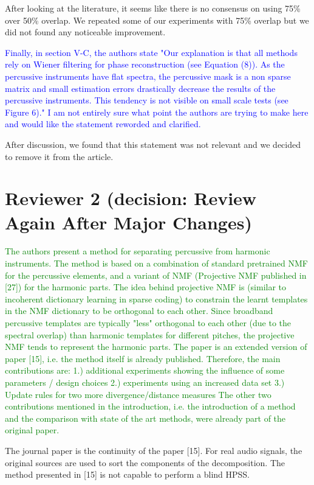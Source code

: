 \documentclass[]{article}
\begin{document}
After looking at the literature, it seems like there is no consensus on using 75\% over 50\% overlap. We repeated some of our experiments with 75\% overlap but we did not found any noticeable improvement. 

\textcolor{blue}{Finally, in section V-C, the authors state
"Our explanation
is that all methods rely on Wiener filtering for phase reconstruction
(see Equation (8)). As the percussive instruments
have flat spectra, the percussive mask is a non sparse matrix
and small estimation errors drastically decrease the results of
the percussive instruments. This tendency is not visible on
small scale tests (see Figure 6)."
I am not entirely sure what point the authors are trying to make here and would like the statement reworded and clarified.}

After discussion, we found that this statement was not relevant and we decided to remove it from the article. 


\section{Reviewer 2 (decision: Review Again After Major Changes)}
\label{sec:rev2}


\textcolor{green}{The authors present a method for separating percussive from harmonic instruments. The method is based on a combination of standard pretrained NMF for the percussive elements, and a variant of NMF (Projective NMF published in [27]) for the harmonic parts. The idea behind projective NMF is (similar to incoherent dictionary learning in sparse coding) to constrain the learnt templates in the NMF dictionary to be orthogonal to each other. Since broadband percussive templates are typically "less" orthogonal to each other (due to the spectral overlap) than harmonic templates for different pitches, the projective NMF tends to represent the harmonic parts.
The paper is an extended version of paper [15], i.e. the method itself is already published. Therefore, the main contributions are:
1.) additional experiments showing the influence of some parameters / design choices
2.) experiments using an increased data set
3.) Update rules for two more divergence/distance measures
The other two contributions mentioned in the introduction, i.e. the introduction of a method and the comparison with state of the art methods, were already part of the original paper.
}

The journal paper is the continuity of the paper [15]. For real audio signals, the original sources are used to sort the components of the decomposition. The method presented in [15] is not capable to perform a blind HPSS.  
\end{document}
